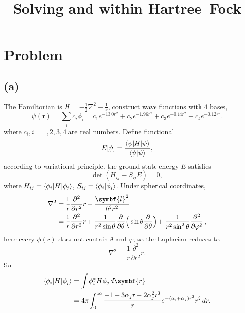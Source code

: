 \documentclass[12pt]{article}
\title{Solving \ce{He} and \ce{H2} within Hartree--Fock}
\author{}
\date{}
\newcommand*{\RMN}[1]{\uppercase\expandafter{\romannumeral#1}}
\begin{document}
\section{Problem \RMN{1}}

\subsection*{(a)}

The Hamiltonian is $H = - \frac{1}{2} \nabla^2 -
    \frac{1}{r}$\thinspace,
construct wave functions with $4$ bases,
\begin{equation}
    \psi(\symbf{r}) = \sum_{i} c_i \phi_i = c_1 e^{- 13.0 r^2} +
    c_2 e^{- 1.96 r^2} + c_3 e^{- 0.44 r^2} + c_4 e^{-0.12 r^2}.
\end{equation}
where $c_i, i=1,2,3,4$ are real numbers.
Define functional
\begin{equation}
    E[\psi] = \frac{\braket{\psi| H | \psi}}{\braket{\psi|\psi}},
\end{equation}
according to variational principle, the ground state energy $E$ satisfies
\begin{equation}
    \det (H_{ij} - S_{ij} E) = 0,
\end{equation}
where $H_{ij} = \braket{\phi_i | H | \phi_j}$, $S_{ij} =
    \braket{\phi_i | \phi_j}$.
Under spherical coordinates,
\begin{equation}
    \begin{aligned}
        \nabla^2 & = \frac{1}{r} \frac{\partial^2}{\partial r^2} r - \frac{\symbf{l}^2}{\hbar^2 r^2} \\
                 & = \frac{1}{r} \frac{\partial^2}{\partial
            r^2}r+{\frac{1}{r^{2}\sin \theta }}{\frac{\partial
        }{\partial \theta }}\Big(\sin \theta {\frac{\partial
            }{\partial \theta }}\Big)+{\frac{1}{r^{2}\sin^{2}\theta }}{\frac{\partial^{2}}{\partial \varphi^{2}}} \thinspace,
    \end{aligned}
\end{equation}
here every $\phi(r)$ does not contain $\theta$ and $\varphi$,
so the Laplacian reduces to
\begin{equation}
    \nabla^2 = \frac{1}{r} \frac{\partial^2}{\partial r^2} r.
\end{equation}
So
\begin{equation}
    \begin{aligned}
        \braket{\phi_i | H | \phi_j} & =
        \int \phi_i^\ast H \phi_j \, d\symbf{r} \\
                                     & =
        4\pi\int_{0}^{\infty} \frac{-1 + 3 \alpha_j r - 2 \alpha_j^2 r^3}{r}
        e^{-(\alpha_i + \alpha_j)r^2}
        r^2\, dr.
    \end{aligned}
\end{equation}
\end{document}
